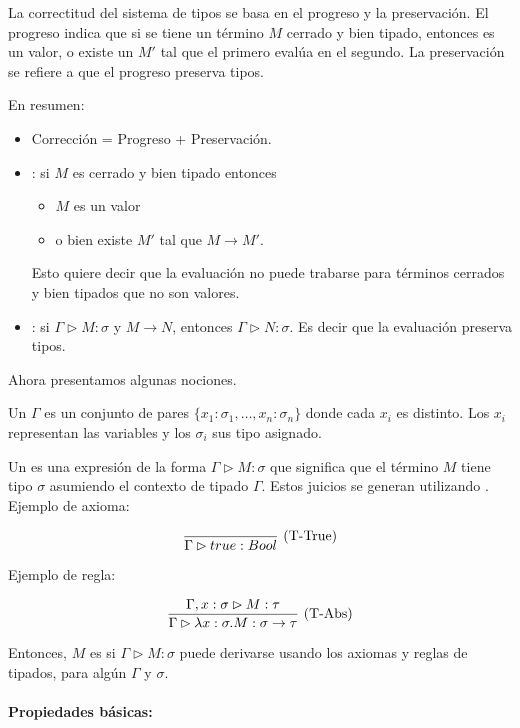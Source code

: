 La correctitud del sistema de tipos se basa en el progreso y la preservación. El progreso indica que si se tiene un término $M$ cerrado y bien tipado, entonces es un valor, o existe un $M'$ tal que el primero evalúa en el segundo. La preservación se refiere a que el progreso preserva tipos.

En resumen:

\begin{itemize}
  \item Corrección = Progreso + Preservación.
  \item {}: si $M$ es cerrado y bien tipado entonces
    \begin{itemize}
      \item $M$ es un valor
      \item o bien existe $M'$ tal que $M \to M'$.
    \end{itemize}
    Esto quiere decir que la evaluación no puede trabarse para términos cerrados y bien tipados que no son valores.
  \item {}: si $\Gamma \rhd M : \sigma$ y $M \to N$, entonces $\Gamma \rhd N : \sigma$. Es decir que la evaluación preserva tipos.
\end{itemize}


Ahora presentamos algunas nociones.

Un  $\Gamma$ es un conjunto de pares $\{x_1:\sigma_1,\dots,x_n:\sigma_n\}$ donde cada $x_i$ es distinto. Los $x_i$ representan las variables y los $\sigma_i$ sus tipo asignado.

Un  es una expresión de la forma $\Gamma \rhd M : \sigma$ que significa que el término $M$ tiene tipo $\sigma$ asumiendo el contexto de tipado $\Gamma$. Estos juicios se generan utilizando . Ejemplo de axioma:

\[\frac{}{\Gamma \rhd true : Bool}\ \text{(T-True)}\]

Ejemplo de regla:

\[\frac{\Gamma, x : \sigma \rhd M : \tau}{\Gamma \rhd \lambda x:\sigma.M:\sigma\to\tau}\ \text{(T-Abs)}\]

\vspace{0.5em}
Entonces, $M$ es   si $\Gamma \rhd M : \sigma$ puede derivarse usando los axiomas y reglas de tipados, para algún $\Gamma$ y $\sigma$.

\paragraph{Propiedades básicas:}

